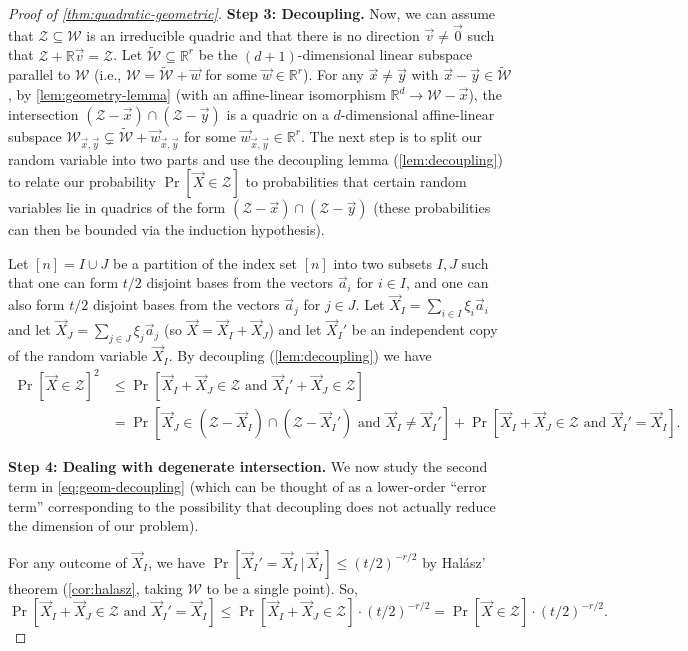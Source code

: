 \documentclass[english]{article}
\theoremstyle{remark}
\numberwithin{equation}{section}
\numberwithin{figure}{section}
\newcommand{\su}{\subseteq}
\newcommand{\RR}{\mathbb{R}}
\newcommand{\mc}{\mathcal}
\begin{document}
\begin{proof}[Proof of \cref{thm:quadratic-geometric}]
\textbf{Step 3: Decoupling.} Now, we can assume that $\mathcal{Z}\subseteq \mathcal{W}$ is an irreducible quadric and that there is
no direction $\vec{v}\ne\vec 0$ such that $\mathcal{Z}+\mathbb{R}\vec{v}=\mathcal{Z}$.
Let $\tilde{\mathcal{W}}\su \RR^r$
be  the $(d+1)$-dimensional linear subspace parallel to $\mathcal{W}$ (i.e., $\mathcal{W}=\tilde{\mathcal{W}}+\vec{w}$
for some $\vec{w}\in\RR^{r}$). For any $\vec{x}\ne\vec{y}$ with $\vec x-\vec y\in \tilde{\mc W}$, by \cref{lem:geometry-lemma} (with an affine-linear isomorphism $\RR^{d}\to \mc W-\vec x$),
 the intersection $(\mathcal{Z}-\vec{x})\cap(\mathcal{Z}-\vec{y})$
is a quadric on a $d$-dimensional affine-linear subspace $\mathcal{W}_{\vec{x},\vec{y}}\subsetneq \tilde{\mathcal{W}}+\vec w_{\vec{x},\vec{y}}$ for some $\vec w_{\vec{x},\vec{y}}\in \RR^r$.
The next step is to split our random variable into two parts and use
the decoupling lemma (\cref{lem:decoupling}) to relate our probability $\Pr[\vec{X}\in\mathcal{Z}]$
to probabilities that certain random variables lie in quadrics
of the form $(\mathcal{Z}-\vec{x})\cap(\mathcal{Z}-\vec{y})$ (these probabilities can then be bounded via the induction hypothesis).

Let $[n]=I\cup J$ be a partition of the index set $[n]$ into two subsets $I,J$ such that one can form $t/2$ disjoint bases from the vectors $\vec a_i$ for $i\in I$, and one can also form $t/2$ disjoint bases from the vectors $\vec a_j$ for $j\in J$. Let $\vec{X}_{I}=\sum_{i\in I}\xi_{i}\vec{a}_{i}$
and let $\vec{X}_{J}=\sum_{j\in J}\xi_{j}\vec{a}_{j}$
(so $\vec{X}=\vec{X}_I+\vec{X}_J$) and let $\vec{X}_I'$ be
an independent copy of the random variable $\vec{X}_I$. By decoupling (\cref{lem:decoupling}) we have
\begin{align}
\Pr[\vec{X}\in\mathcal{Z}]^{2} & \le\Pr[\vec{X}_I+\vec{X}_J\in\mathcal{Z}\text{ and }\vec{X}_I'+\vec{X}_J\in\mathcal{Z}]\nonumber \\
 & =\Pr[\vec{X}_J\in(\mathcal{Z}-\vec{X}_I)\cap(\mathcal{Z}-\vec{X}_I')\text{ and }\vec{X}_I\ne\vec{X}_I']+\Pr[\vec{X}_I+\vec{X}_J\in\mathcal{Z}\text{ and }\vec{X}_I'=\vec{X}_I].\label{eq:geom-decoupling}
\end{align}

\textbf{Step 4: Dealing with degenerate intersection.} We now study the second term in \cref{eq:geom-decoupling} (which can be
thought of as a lower-order ``error term'' corresponding to the possibility
that decoupling does not actually reduce the dimension of our problem).

For any outcome of $\vec{X}_I$, we have $\Pr[\vec{X}_I'=\vec{X}_I\,|\,\vec{X}_I]\le(t/2)^{-r/2}$
by Hal\'asz' theorem (\cref{cor:halasz}, taking  $\mathcal{W}$ to be a single point). So, 
\begin{equation}
\Pr[\vec{X}_I+\vec{X}_J\in\mathcal{Z}\text{ and }\vec{X}_I'=\vec{X}_I]\le \Pr[\vec{X}_I+\vec{X}_J\in\mathcal{Z}]\cdot (t/2)^{-r/2}=\Pr[\vec{X}\in\mathcal{Z}]\cdot (t/2)^{-r/2}.\label{eq:geom-error-term}
\end{equation}


\end{proof}
\end{document}
